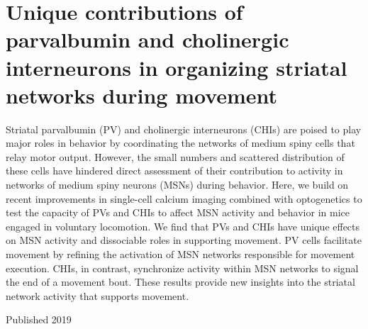 \section*{Unique contributions of parvalbumin and cholinergic interneurons in organizing striatal networks during movement}
\label{sec:hg}

Striatal parvalbumin (PV) and cholinergic interneurons (CHIs) are poised to play major roles in behavior by coordinating the networks of medium spiny cells that relay motor output.
However, the small numbers and scattered distribution of these cells have hindered direct assessment of their contribution to activity in networks of medium spiny neurons (MSNs) during behavior.
Here, we build on recent improvements in single-cell calcium imaging combined with optogenetics to test the capacity of PVs and CHIs to affect MSN activity and behavior in mice engaged in voluntary locomotion.
We find that PVs and CHIs have unique effects on MSN activity and dissociable roles in supporting movement.
PV cells facilitate movement by refining the activation of MSN networks responsible for movement execution.
CHIs, in contrast, synchronize activity within MSN networks to signal the end of a movement bout.
These results provide new insights into the striatal network activity that supports movement.

\noindent
Published 2019 \cite{Gritton_2019}
\clearpage


